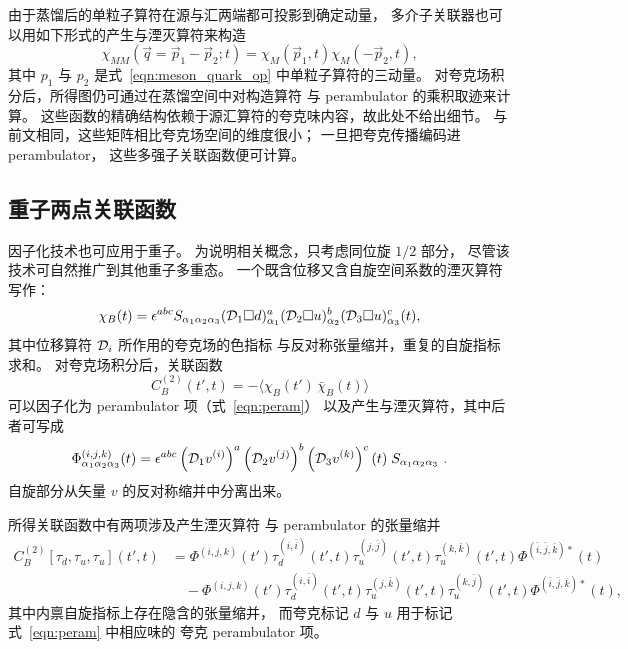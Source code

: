 由于蒸馏后的单粒子算符在源与汇两端都可投影到确定动量，
多介子关联器也可以用如下形式的产生与湮灭算符来构造
\begin{equation}
\chi_{MM}(\vec{q}=\vec{p}_1 - \vec{p}_2; t) = \chi_M(\vec{p}_1,t)
  \chi_M(-\vec{p}_2,t),
\label{eqn:multi_meson_quark_op}
\end{equation}
其中 $p_1$ 与 $p_2$ 是式~\ref{eqn:meson_quark_op} 中单粒子算符的三动量。
对夸克场积分后，所得图仍可通过在蒸馏空间中对构造算符
与 perambulator 的乘积取迹来计算。
这些函数的精确结构依赖于源汇算符的夸克味内容，故此处不给出细节。
与前文相同，这些矩阵相比夸克场空间的维度很小；
一旦把夸克传播编码进 perambulator，
这些多强子关联函数便可计算。

\subsection{重子两点关联函数}\label{subsec:theory-baryons}

因子化技术也可应用于重子。
为说明相关概念，只考虑同位旋 $1/2$ 部分，
尽管该技术可自然推广到其他重子多重态。
一个既含位移又含自旋空间系数的湮灭算符写作：
\begin{equation}
\chi_B(t) = \epsilon^{abc} S_{\alpha_1\alpha_2\alpha_3}
({\cal D}_1\Box d)^a_{\alpha_1}
({\cal D}_2\Box u)^b_{\alpha_2}
({\cal D}_3\Box u)^c_{\alpha_3}(t),
\end{equation}
其中位移算符 ${\cal D}_i$ 所作用的夸克场的色指标
与反对称张量缩并，重复的自旋指标求和。
对夸克场积分后，关联函数
\begin{equation}
   C^{(2)}_B(t',t) = -\Big\langle \chi_B(t') \, \bar{\chi}_B(t)\Big\rangle
\end{equation}
可以因子化为 perambulator 项（式~\ref{eqn:peram}）
以及产生与湮灭算符，其中后者可写成
\begin{equation}
 \Phi^{(i,j,k)}_{\alpha_1\alpha_2\alpha_3}(t) = \epsilon^{abc}
\left({\cal D}_1 v^{(i)}\right)^{a}
\left({\cal D}_2 v^{(j)}\right)^{b}
\left({\cal D}_3 v^{(k)}\right)^{c}(t)\;
S_{\alpha_1\alpha_2\alpha_3}\ .
\label{eqn:baryon_op}
\end{equation}
自旋部分从矢量 $v$ 的反对称缩并中分离出来。

所得关联函数中有两项涉及产生湮灭算符
与 perambulator 的张量缩并
\begin{align}
C^{(2)}_B[\tau_d,\tau_u,\tau_u](t',t) &=
  \Phi^{(i,j,k)}(t')
  \tau_d^{(i,\bar{i})}(t',t)
  \tau_u^{(j,\bar{j})}(t',t)
  \tau_u^{(k,\bar{k})}(t',t)
  \Phi^{(\bar{i},\bar{j},\bar{k})*}(t)
  \nonumber\\
 &\quad- \Phi^{(i,j,k)}(t')
  \tau_d^{(i,\bar{i})}(t',t)
  \tau_u^{(j,\bar{k})}(t',t)
  \tau_u^{(k,\bar{j})}(t',t)
  \Phi^{(\bar{i},\bar{j},\bar{k})*}(t),
\end{align}
其中内禀自旋指标上存在隐含的张量缩并，
而夸克标记 $d$ 与 $u$ 用于标记式~\ref{eqn:peram} 中相应味的
夸克 perambulator 项。

